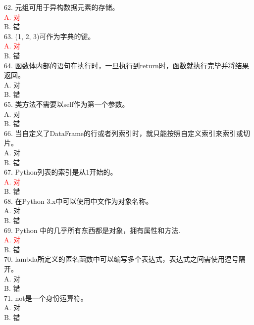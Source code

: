 \documentclass[6pt]{article}
\begin{document}
62. 元组可用于异构数据元素的存储。\\

\textcolor{red}{A. 对}\\
B. 错\\

63. (1, 2, 3)可作为字典的键。\\
\textcolor{red}{A. 对}\\
B. 错\\

64. 函数体内部的语句在执行时，一旦执行到return时，函数就执行完毕并将结果返回。\\

A. 对\\
B. 错\\

65. 类方法不需要以self作为第一个参数。\\
A. 对\\
B. 错\\

66. 当自定义了DataFrame的行或者列索引时，就只能按照自定义索引来索引或切片。\\

A. 对\\
B. 错\\

67. Python列表的索引是从1开始的。\\

\textcolor{red}{A. 对}\\
B. 错\\

68. 在Python 3.x中可以使用中文作为对象名称。\\

A. 对\\
B. 错\\

69. Python 中的几乎所有东西都是对象，拥有属性和方法.\\

\textcolor{red}{A. 对}\\
B. 错\\

70. lambda所定义的匿名函数中可以编写多个表达式，表达式之间需使用逗号隔开。\\

A. 对\\
B. 错\\

71. not是一个身份运算符。\\

A. 对\\
B. 错\\
\end{document}
